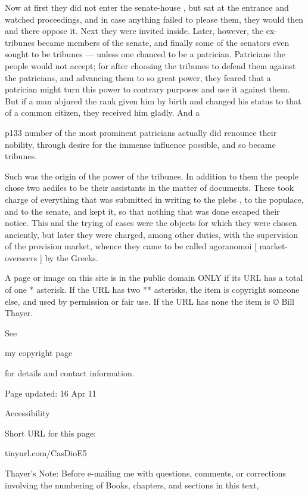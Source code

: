 Now at first they did not enter the senate-house , but sat at the entrance and watched proceedings, and in case anything failed to please them, they would then and there oppose it. Next they were invited inside. Later, however, the ex-tribunes became members of the senate, and finally some of the senators even sought to be tribunes \texthebrew{—} unless one chanced to be a patrician. Patricians the people would not accept; for after choosing the tribunes to defend them against the patricians, and advancing them to so great power, they feared that a patrician might turn this power to contrary purposes and use it against them. But if a man abjured the rank given him by birth and changed his status to that of a common citizen, they received him gladly. And a

p133 number of the most prominent patricians actually did renounce their nobility, through desire for the immense influence possible, and so became tribunes.

Such was the origin of the power of the tribunes. In addition to them the people chose two aediles to be their assistants in the matter of documents. These took charge of everything that was submitted in writing to the plebs , to the populace, and to the senate, and kept it, so that nothing that was done escaped their notice. This and the trying of cases were the objects for which they were chosen anciently, but later they were charged, among other duties, with the supervision of the provision market, whence they came to be called agoranomoi [ market-overseers ] by the Greeks.

A page or image on this site is in the public domain ONLY if its URL has a total of one * asterisk. If the URL has two ** asterisks, the item is copyright someone else, and used by permission or fair use. If the URL has none the item is \emph{©} Bill Thayer.

See

my copyright page

for details and contact information.

Page updated:
16 Apr 11

Accessibility


Short URL for this page:

tinyurl.com/CasDioE5

Thayer's Note: Before e-mailing me with questions, comments, or corrections involving the numbering of Books, chapters, and sections in this text,

